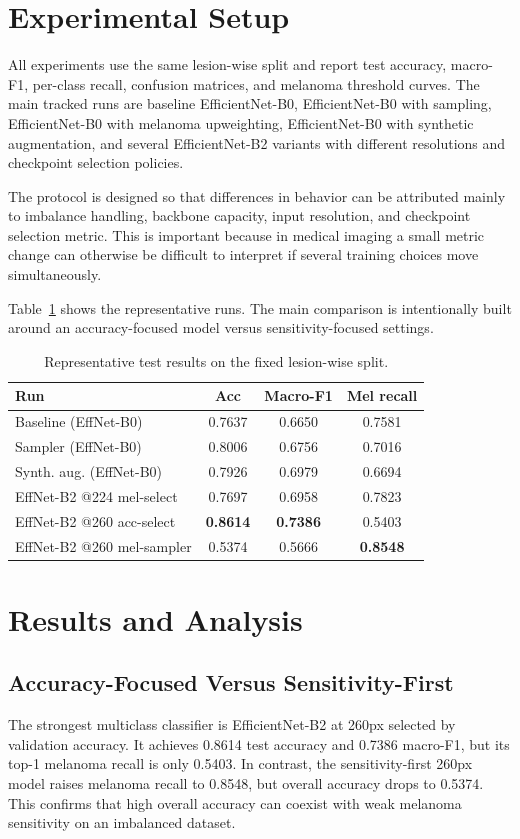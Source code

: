 \documentclass[conference]{IEEEtran}
\begin{document}
\section{Experimental Setup}
All experiments use the same lesion-wise split and report test accuracy, macro-F1, per-class recall, confusion matrices, and melanoma threshold curves. The main tracked runs are baseline EfficientNet-B0, EfficientNet-B0 with sampling, EfficientNet-B0 with melanoma upweighting, EfficientNet-B0 with synthetic augmentation, and several EfficientNet-B2 variants with different resolutions and checkpoint selection policies.

The protocol is designed so that differences in behavior can be attributed mainly to imbalance handling, backbone capacity, input resolution, and checkpoint selection metric. This is important because in medical imaging a small metric change can otherwise be difficult to interpret if several training choices move simultaneously.

Table~\ref{tab:mainruns} shows the representative runs. The main comparison is intentionally built around an accuracy-focused model versus sensitivity-focused settings.

\begin{table}[t]
  \centering
  \caption{Representative test results on the fixed lesion-wise split.}
  \label{tab:mainruns}
  \begin{tabular}{lccc}
    \toprule
    Run & Acc & Macro-F1 & Mel recall \\
    \midrule
    Baseline (EffNet-B0) & 0.7637 & 0.6650 & 0.7581 \\
    Sampler (EffNet-B0) & 0.8006 & 0.6756 & 0.7016 \\
    Synth. aug. (EffNet-B0) & 0.7926 & 0.6979 & 0.6694 \\
    EffNet-B2 @224 mel-select & 0.7697 & 0.6958 & 0.7823 \\
    EffNet-B2 @260 acc-select & \textbf{0.8614} & \textbf{0.7386} & 0.5403 \\
    EffNet-B2 @260 mel-sampler & 0.5374 & 0.5666 & \textbf{0.8548} \\
    \bottomrule
  \end{tabular}
\end{table}

\section{Results and Analysis}
\subsection{Accuracy-Focused Versus Sensitivity-First}
The strongest multiclass classifier is EfficientNet-B2 at 260px selected by validation accuracy. It achieves 0.8614 test accuracy and 0.7386 macro-F1, but its top-1 melanoma recall is only 0.5403. In contrast, the sensitivity-first 260px model raises melanoma recall to 0.8548, but overall accuracy drops to 0.5374. This confirms that high overall accuracy can coexist with weak melanoma sensitivity on an imbalanced dataset.
\end{document}
